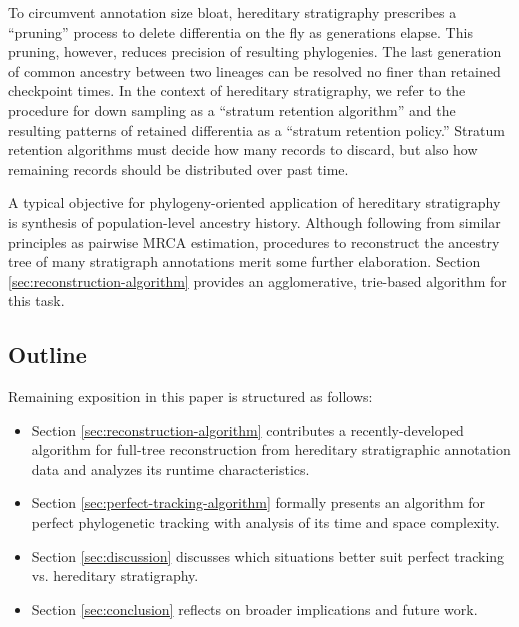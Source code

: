To circumvent annotation size bloat, hereditary stratigraphy prescribes a ``pruning'' process to delete differentia on the fly as generations elapse.
This pruning, however, reduces precision of resulting phylogenies.
The last generation of common ancestry between two lineages can be resolved no finer than retained checkpoint times.
In the context of hereditary stratigraphy, we refer to the procedure for down sampling as a ``stratum retention algorithm'' and the resulting patterns of retained differentia as a ``stratum retention policy.''
Stratum retention algorithms must decide how many records to discard, but also how remaining records should be distributed over past time.

A typical objective for phylogeny-oriented application of hereditary stratigraphy is synthesis of population-level ancestry history.
Although following from similar principles as pairwise MRCA estimation, procedures to reconstruct the ancestry tree of many stratigraph annotations merit some further elaboration.
Section \ref{sec:reconstruction-algorithm} provides an agglomerative, trie-based algorithm for this task.

\subsection{Outline}

Remaining exposition in this paper is structured as follows:
\begin{itemize}
\item Section \ref{sec:reconstruction-algorithm} contributes a recently-developed algorithm for full-tree reconstruction from hereditary stratigraphic annotation data and analyzes its runtime characteristics.
\item Section \ref{sec:perfect-tracking-algorithm} formally presents an algorithm for perfect phylogenetic tracking with analysis of its time and space complexity.
\item Section \ref{sec:discussion} discusses which situations better suit perfect tracking vs. hereditary stratigraphy.
\item Section \ref{sec:conclusion} reflects on broader implications and future work.
\end{itemize}
